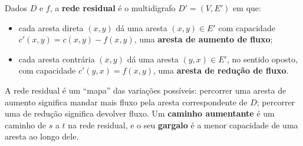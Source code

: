 \begin{defi}
Dados $D$ e $f$, a \textbf{rede residual} é o multidigrafo $D'=(V,E')$ em que:
\begin{itemize}
  \item cada aresta direta $(x,y)$ dá uma aresta $(x,y)\in E'$ com capacidade $c'(x,y)=c(x,y)-f(x,y)$, uma \textbf{aresta de aumento de fluxo};
  \item cada aresta contrária $(x,y)$ dá uma aresta $(y,x)\in E'$, no sentido oposto, com capacidade $c'(y,x)=f(x,y)$, uma \textbf{aresta de redução de fluxo}.
\end{itemize}
\end{defi}
A rede residual é um ``mapa'' das variações possíveis: percorrer uma aresta de aumento significa mandar mais fluxo pela aresta correspondente de $D$; percorrer uma de redução significa devolver fluxo. Um \textbf{caminho aumentante} é um caminho de $s$ a $t$ na rede residual, e o seu \textbf{gargalo} é a menor capacidade de uma aresta ao longo dele.

